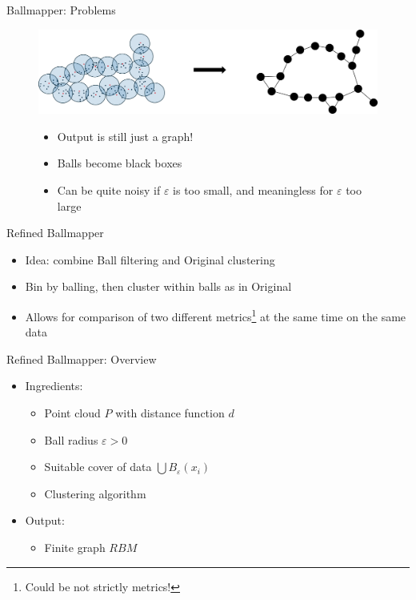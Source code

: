 \documentclass{beamer}
\begin{document}
\begin{frame}{Ballmapper: Problems}
  \begin{figure}
    \begin{center}
      \includegraphics[width=1\textwidth]{ballmapperarrow.png}
    \end{center}
    \begin{itemize}
      \item Output is still just a graph!
      \item Balls become black boxes
      \item Can be quite noisy if $\varepsilon$ is too small, and meaningless for $\varepsilon$ too large
    \end{itemize}
  \end{figure}
\end{frame}

\begin{frame}{Refined Ballmapper}
  \begin{itemize}
    \item Idea: combine Ball filtering and Original clustering
    \item Bin by balling, then cluster within balls as in Original
    \item Allows for comparison of two different metrics\footnote{Could be not strictly metrics!} at the same time on the same data
  \end{itemize}
  
\end{frame}

\begin{frame}{Refined Ballmapper: Overview}
  \begin{itemize}
    \item Ingredients:
    \begin{itemize}
      \item Point cloud $P$ with distance function $d$
      \item Ball radius $\varepsilon > 0$
      \item Suitable cover of data $\bigcup B_\varepsilon(x_i)$
      \item Clustering algorithm
    \end{itemize}
    \item Output:
    \begin{itemize}
      \item Finite graph $RBM$
    \end{itemize}
  \end{itemize}
\end{frame}
\end{document}
